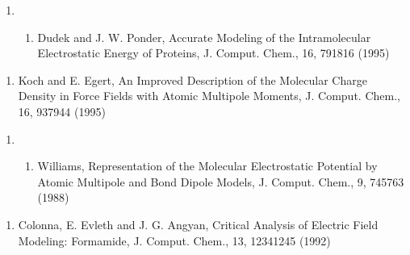 \documentclass[letterpaper,11pt,english]{sphinxmanual}
\begin{document}
\begin{enumerate}
%
\setcounter{enumi}{12}
\item {} \begin{enumerate}
%
\setcounter{enumii}{9}
\item {} 
Dudek and J. W. Ponder, Accurate Modeling of the Intramolecular Electrostatic Energy of Proteins, J. Comput. Chem., 16, 791\sphinxhyphen{}816 (1995)

\end{enumerate}

\end{enumerate}
\begin{enumerate}
%
\setcounter{enumi}{20}
\item {} 
Koch and E. Egert, An Improved Description of the Molecular Charge Density in Force Fields with Atomic Multipole Moments, J. Comput. Chem., 16, 937\sphinxhyphen{}944 (1995)

\end{enumerate}
\begin{enumerate}
%
\setcounter{enumi}{3}
\item {} \begin{enumerate}
%
\setcounter{enumii}{4}
\item {} 
Williams, Representation of the Molecular Electrostatic Potential by Atomic Multipole and Bond Dipole Models, J. Comput. Chem., 9, 745\sphinxhyphen{}763 (1988)

\end{enumerate}

\end{enumerate}
\begin{enumerate}
%
\setcounter{enumi}{5}
\item {} 
Colonna, E. Evleth and J. G. Angyan, Critical Analysis of Electric Field Modeling: Formamide, J. Comput. Chem., 13, 1234\sphinxhyphen{}1245 (1992)

\end{enumerate}
\end{document}
